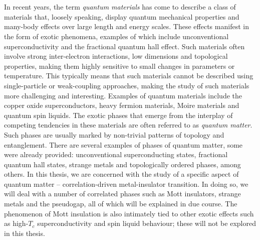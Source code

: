 \chapter{\chapA}\label{sec:Introduction}
In recent years, the term {\it quantum materials} has come to describe a class of materials that, loosely speaking, display quantum mechanical properties and many-body effects over large length and energy scales. These effects manifest in the form of exotic phenomena, examples of which include unconventional superconductivity and the fractional quantum hall effect. Such materials often involve strong inter-electron interactions, low dimensions and topological properties, making them highly sensitive to small changes in parameters or temperature. This typically means that such materials cannot be described using single-particle or weak-coupling approaches, making the study of such materials more challenging and interesting. Examples of quantum materials include the copper oxide superconductors, heavy fermion materials, Moire materials and quantum spin liquids. The exotic phases that emerge from the interplay of competing tendencies in these materials are often referred to as {\it quantum matter}. Such phases are usually marked by non-trivial patterns of topology and entanglement. There are several examples of phases of quantum matter, some were already provided: unconventional superconducting states, fractional quantum hall states, strange metals and topologically ordered phases, among others. In this thesis, we are concerned with the study of a specific aspect of quantum matter -- correlation-driven metal-insulator transition. In doing so, we will deal with a number of correlated phases such as Mott insulators, strange metals and the pseudogap, all of which will be explained in due course. The phenomenon of Mott insulation is also intimately tied to other exotic effects such as high-$T_c$ superconductivity and spin liquid behaviour; these will not be explored in this thesis.

